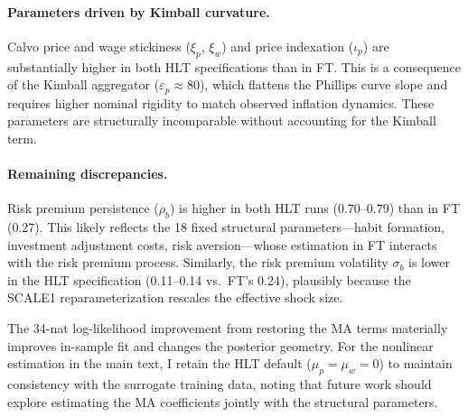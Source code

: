 \documentclass[12pt]{article}
\theoremstyle{plain}
\theoremstyle{definition}
\theoremstyle{remark}
\begin{document}
\paragraph{Parameters driven by Kimball curvature.} Calvo price and wage stickiness ($\xi_p$, $\xi_w$) and price indexation ($\iota_p$) are substantially higher in both HLT specifications than in FT. This is a consequence of the Kimball aggregator ($\varepsilon_p \approx 80$), which flattens the Phillips curve slope and requires higher nominal rigidity to match observed inflation dynamics. These parameters are structurally incomparable without accounting for the Kimball term.

\paragraph{Remaining discrepancies.} Risk premium persistence ($\rho_b$) is higher in both HLT runs (0.70--0.79) than in FT (0.27). This likely reflects the 18 fixed structural parameters---habit formation, investment adjustment costs, risk aversion---whose estimation in FT interacts with the risk premium process. Similarly, the risk premium volatility $\sigma_b$ is lower in the HLT specification (0.11--0.14 vs.\ FT's 0.24), plausibly because the SCALE1 reparameterization rescales the effective shock size.

The 34-nat log-likelihood improvement from restoring the MA terms materially improves in-sample fit and changes the posterior geometry. For the nonlinear estimation in the main text, I retain the HLT default ($\mu_p = \mu_w = 0$) to maintain consistency with the surrogate training data, noting that future work should explore estimating the MA coefficients jointly with the structural parameters.


\clearpage

\fi
\end{document}
